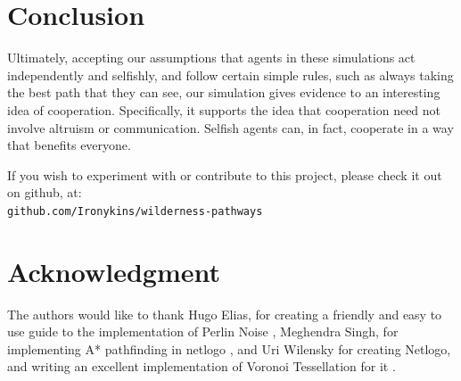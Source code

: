 \documentclass[conference]{IEEEtran}
\begin{document}




\section{Conclusion}
	Ultimately, accepting our assumptions that agents in these simulations act independently and selfishly, and follow certain simple rules, such as always taking the best path that they can see, our simulation gives evidence to an interesting idea of cooperation. Specifically, it supports the idea that cooperation need not involve altruism or communication. Selfish agents can, in fact, cooperate in a way that benefits everyone.

	If you wish to experiment with or contribute to this project, please check it out on github, at: \\
\verb+github.com/Ironykins/wilderness-pathways+




\section*{Acknowledgment}

The authors would like to thank Hugo Elias, for creating a friendly and easy to use guide to the implementation of Perlin Noise \cite{elias:perlin}, Meghendra Singh, for implementing A* pathfinding in netlogo \cite{singh:astar}, and Uri Wilensky for creating Netlogo, and writing an excellent implementation of Voronoi Tessellation for it \cite{wilensky:voronoi} \cite{wilensky:netlogo}.





\end{document}
